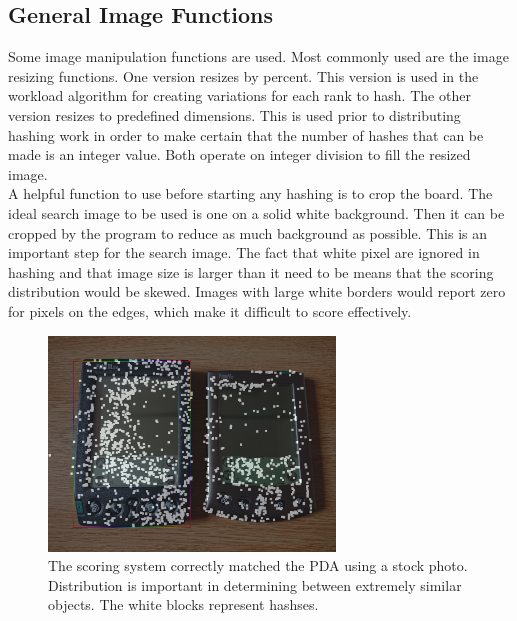 \documentclass[10pt, journal]{vgtc}                %
\newcommand\tab[1][1cm]{\hspace*{#1}}
\begin{document}
\subsection{General Image Functions}

\tab Some image manipulation functions are used. Most commonly used are the image resizing functions. One version resizes by percent. This version is used in the workload algorithm for creating variations for each rank to hash. The other version resizes to predefined dimensions. This is used prior to distributing hashing work in order to make certain that the number of hashes that can be made is an integer value. Both operate on integer division to fill the resized image.\smallskip \\
\tab A helpful function to use before starting any hashing is to crop the board. The ideal search image to be used is one on a solid white background. Then it can be cropped by the program to reduce as much background as possible. This is an important step for the search image. The fact that white pixel are ignored in hashing and that image size is larger than it need to be means that the scoring distribution would be skewed. Images with large white borders would report zero for pixels on the edges, which make it difficult to score effectively.

\begin{figure}[h!]
	\centering
	\includegraphics[width=3.0in]{overlay_pda.png}
	\caption[White boxes represent hash blocks]{The scoring system correctly matched the PDA using a stock photo. Distribution is important in determining between extremely similar objects. The white blocks represent hashses.}
\end{figure}
\end{document}
